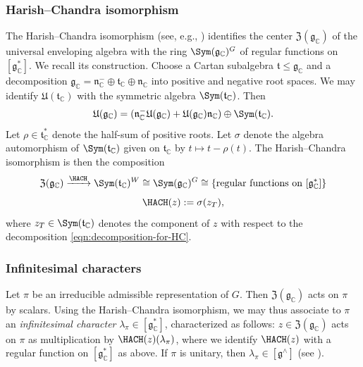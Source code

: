 \subsubsection{Harish--Chandra isomorphism}\label{sec:cui1fnha7b}
The Harish--Chandra isomorphism (see, e.g., \cite[\S9.4]{nelson-venkatesh-1}) identifies the center $\mathfrak{Z}(\mathfrak{g}_\mathbb{C})$ of the universal enveloping algebra with the ring $\Sym(\mathfrak{g}_{\mathbb{C}})^G$ of regular functions on $[\mathfrak{g}_\mathbb{C}^*]$.  We recall its construction.  Choose a Cartan subalgebra $\mathfrak{t} \leq \mathfrak{g}_\mathbb{C}$ and a decomposition $\mathfrak{g}_\mathbb{C} = \mathfrak{n}_{\mathbb{C}}^- \oplus \mathfrak{t}_\mathbb{C} \oplus \mathfrak{n}_{\mathbb{C}}$ into positive and negative root spaces.  We may identify $\mathfrak{U}(\mathfrak{t}_\mathbb{C})$ with the symmetric algebra $\Sym(\mathfrak{t}_\mathbb{C})$.  Then
\begin{equation}\label{eqn:decomposition-for-HC}
  \mathfrak{U}(\mathfrak{g}_\mathbb{C})
  = (\mathfrak{n}_{\mathbb{C}}^- \mathfrak{U}(\mathfrak{g}_{\mathbb{C}})
  + \mathfrak{U}(\mathfrak{g}_{\mathbb{C}})
  \mathfrak{n}_{\mathbb{C}})
  \oplus \Sym(\mathfrak{t}_\mathbb{C}).
\end{equation}
Let $\rho \in \mathfrak{t}_\mathbb{C}^*$ denote the half-sum of positive roots.  Let $\sigma$ denote the algebra automorphism of $\Sym(\mathfrak{t}_\mathbb{C})$ given on $\mathfrak{t}_\mathbb{C}$ by $t \mapsto t - \rho(t)$.  The Harish--Chandra isomorphism is then the composition
\[
  \mathfrak{Z}(\mathfrak{g}_\mathbb{C}) \xrightarrow{\HACH} \Sym(\mathfrak{t}_\mathbb{C})^W
  \cong
  \Sym(\mathfrak{g}_{\mathbb{C}})^G \cong \{\text{regular functions on } [\mathfrak{g}_\mathbb{C}^*]\}
\]
\[
  \HACH(z) := \sigma(z_T),
\]
where $z_T \in \Sym(\mathfrak{t}_\mathbb{C})$ denotes the component of $z$ with respect to the decomposition \eqref{eqn:decomposition-for-HC}.

\subsubsection{Infinitesimal characters}\label{sec:infin-char}
Let $\pi$ be an irreducible admissible representation of $G$.  Then $\mathfrak{Z}(\mathfrak{g}_{\mathbb{C}})$ acts on $\pi$ by scalars.  Using the Harish--Chandra isomorphism, we may thus associate to $\pi$ an  \emph{infinitesimal character} $\lambda_\pi \in [\mathfrak{g}^*_{\mathbb{C}}]$, characterized as follows: $z \in \mathfrak{Z}(\mathfrak{g}_{\mathbb{C}})$ acts on $\pi$ as multiplication by $\HACH(z)(\lambda_\pi)$, where we identify $\HACH(z)$ with a regular function on $[\mathfrak{g}^*_{\mathbb{C}}]$ as above.  If $\pi$ is unitary, then $\lambda_\pi \in [\mathfrak{g}^\wedge]$ (see \cite[\S9.5]{nelson-venkatesh-1}).

